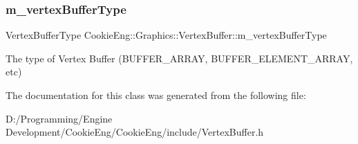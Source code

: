 \subsubsection{\texorpdfstring{m\+\_\+vertex\+Buffer\+Type}{m\_vertexBufferType}}
{\footnotesize\ttfamily Vertex\+Buffer\+Type Cookie\+Eng\+::\+Graphics\+::\+Vertex\+Buffer\+::m\+\_\+vertex\+Buffer\+Type\hspace{0.3cm}{\ttfamily [protected]}}

The type of Vertex Buffer (B\+U\+F\+F\+E\+R\+\_\+\+A\+R\+R\+AY, B\+U\+F\+F\+E\+R\+\_\+\+E\+L\+E\+M\+E\+N\+T\+\_\+\+A\+R\+R\+AY, etc) 

The documentation for this class was generated from the following file\+:\begin{DoxyCompactItemize}
\item 
D\+:/\+Programming/\+Engine Development/\+Cookie\+Eng/\+Cookie\+Eng/include/Vertex\+Buffer.\+h\end{DoxyCompactItemize}
